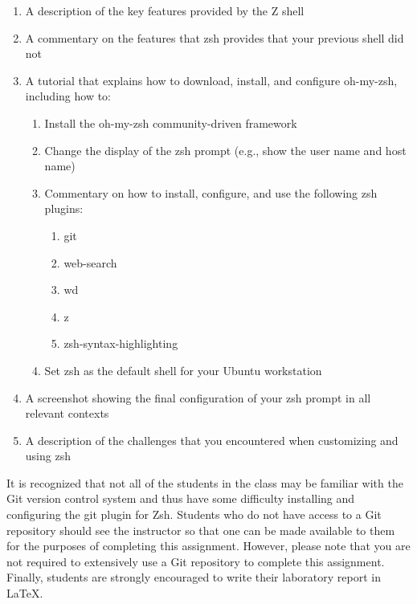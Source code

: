 \begin{enumerate}
	
	\item A description of the key features provided by the Z shell

	\item A commentary on the features that zsh provides that your previous shell did not

	\item A tutorial that explains how to download, install, and configure oh-my-zsh, including how to:

	  \begin{enumerate}

	    \item Install the oh-my-zsh community-driven framework

	    \item Change the display of the zsh prompt (e.g., show the user name and host name)

	    \item Commentary on how to install, configure, and use the following zsh plugins:

	      \begin{enumerate}

	        \item git
		  
		\item web-search

		\item wd 	

		\item z

		\item zsh-syntax-highlighting

	      \end{enumerate}

	    \item Set zsh as the default shell for your Ubuntu workstation

	  \end{enumerate}

	\item A screenshot showing the final configuration of your zsh prompt in all relevant contexts

	\item A description of the challenges that you encountered when customizing and using zsh

\end{enumerate}

It is recognized that not all of the students in the class may be familiar with the Git version control system and thus have some
difficulty installing and configuring the git plugin for Zsh.  Students who do not have access to a Git repository should see the
instructor so that one can be made available to them for the purposes of completing this assignment. However, please note that you
are not required to extensively use a Git repository to complete this assignment. Finally, students are strongly encouraged to
write their laboratory report in \LaTeX.

